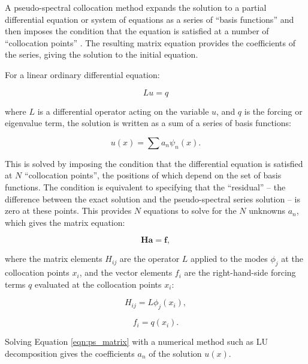 A pseudo-spectral collocation method expands the solution to a partial differential equation or system of equations as a series of ``basis functions'' and then imposes the condition that the equation is satisfied at a number of ``collocation points'' \citep{boyd2000spectral}. The resulting matrix equation provides the coefficients of the series, giving the solution to the initial equation.

For a linear ordinary differential equation:

\begin{equation}\label{eqn:ps-original-eqn}
  L u = q
\end{equation}

where $L$ is a differential operator acting on the variable $u$, and $q$ is the forcing or eigenvalue term, the solution is written as a sum of a series of basis functions:

\begin{equation}\label{eqn:pseudospectral_sum}
  u(x) = \sum a_{n} \psi_{n}(x).
\end{equation}

This is solved by imposing the condition that the differential equation is satisfied at $N$ ``collocation points'', the positions of which depend on the set of basis functions. The condition is equivalent to specifying that the ``residual'' -- the difference between the exact solution and the pseudo-spectral series solution -- is zero at these points. This provides $N$ equations to solve for the $N$ unknowns $a_{n}$, which gives the matrix equation:

\begin{equation}\label{eqn:ps_matrix}
 \textbf{H} \textbf{a} = \textbf{f},
\end{equation}

where the matrix elements $H_{ij}$ are the operator $L$ applied to the modes $\phi_{j}$ at the collocation points $x_{i}$, and the vector elements $f_{i}$ are the right-hand-side forcing terms $q$ evaluated at the collocation points $x_{i}$:

\begin{equation}\label{eqn:ps_H}
  H_{ij} = L \phi_{j}(x_{i}),
\end{equation}

\begin{equation}
  f_{i} = q(x_{i}).
\end{equation}

Solving Equation \ref{eqn:ps_matrix} with a numerical method such as LU decomposition gives the coefficients $a_{n}$ of the solution $u(x)$.



